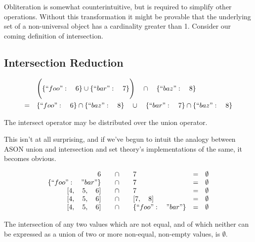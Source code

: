 \documentclass[letterpaper]{article}
\begin{document}
Obliteration is somewhat counterintuitive, but is required to simplify other
operations. Without this transformation it might be provable that the
underlying set of a non-universal object has a cardinality greater than 1.
Consider our coming definition of intersection.

\subsection{Intersection Reduction}

\begin{prule}
\label{sec:interdist}
\begin{equation}
\begin{split}
& \Bigg( \{``foo":\quad6\} \cup \{``bar":\quad7\} \Bigg) \quad \cap \quad
\{``baz":\quad8\} \\
= \quad& \{``foo":\quad6\} \cap \{``baz":\quad8\} \quad \cup \quad \{``bar":\quad7\}
 \cap \{``baz":\quad8\}
\end{split}
\end{equation}

The intersect operator may be distributed over the union operator.
\end{prule}

This isn't at all surprising, and if we've begun to intuit the analogy between
ASON union and intersection and set theory's implementations of the same, it
becomes obvious.

\begin{prule}
\label{sec:interelim}
\begin{equation}
\begin{array}{rclcl}
6 \quad&\cap&\quad 7 & = & \emptyset \\
\{``foo":\quad"bar"\} \quad&\cap&\quad 7 & = & \emptyset \\
{[}4,\quad5,\quad6] \quad&\cap&\quad 7 & = & \emptyset \\
{[}4,\quad5,\quad6] \quad&\cap&\quad {[}7,\quad8] & = & \emptyset \\
{[}4,\quad5,\quad6] \quad&\cap&\quad \{``foo":\quad"bar"\} & = & \emptyset \\
\end{array}
\end{equation}

The intersection of any two values which are not equal, and of which neither
can be expressed as a union of two or more non-equal, non-empty values, is
\(\emptyset\).
\end{prule}
\end{document}
